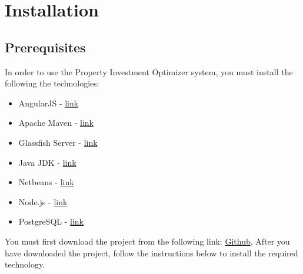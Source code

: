 \documentclass[a4paper,12pt]{article}
\begin{document}
\section{Installation}

\subsection{Prerequisites}
In order to use the Property Investment Optimizer system, you must install the following the technologies:
\begin{itemize}
\item{AngularJS - \href{https://angularjs.org/}{link}}
\item{Apache Maven - \href{https://maven.apache.org/download.cgi}{link}}
\item{Glassfish Server - \href{https://glassfish.java.net/download.html}{link}}
\item{Java JDK - \href{http://www.oracle.com/technetwork/java/javase/downloads/index.html}{link}}
\item{Netbeans - \href{https://netbeans.org/downloads/}{link}}
\item{Node.js - \href{https://nodejs.org/en/download/}{link}}
\item{PostgreSQL - \href{https://www.postgresql.org/download/}{link}}
\end{itemize}
You must first download the project from the following link: \href{https://github.com/u13278012/IMPAKD}{Github}. After you have downloaded the project, follow the instructions below to install the required technology.


\newpage
\end{document}
